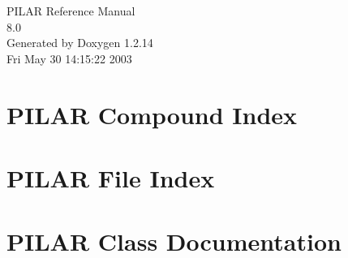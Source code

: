 \documentclass[a4paper]{book}
\begin{document}
\begin{titlepage}
\vspace*{7cm}
\begin{center}
{\Large PILAR Reference Manual\\[1ex]\large 8.0}\\
\vspace*{1cm}
{\large Generated by Doxygen 1.2.14}\\
\vspace*{0.5cm}
{\small Fri May 30 14:15:22 2003}\\
\end{center}
\end{titlepage}
\clearemptydoublepage
{}
\tableofcontents
\clearemptydoublepage
{}
\chapter{PILAR Compound Index}

\chapter{PILAR File Index}

\chapter{PILAR Class Documentation}



































\end{document}
